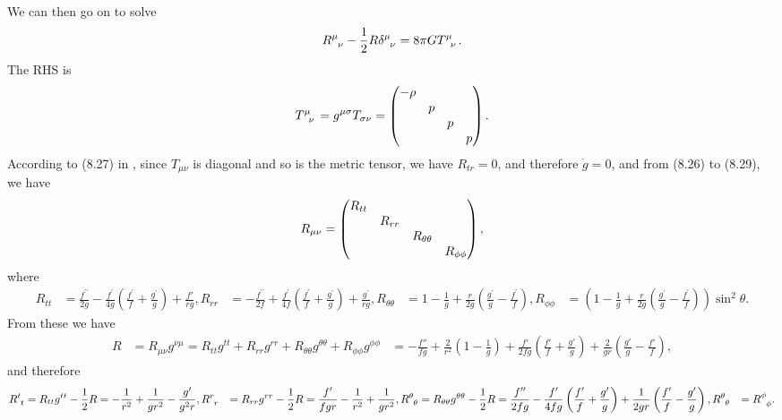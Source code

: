 \documentclass[hyperref, a4paper]{article}
\def\\{}%
\begin{document}
We can then go on to solve 
\begin{equation}
    R\indices{^\mu_\nu} - \frac{1}{2} R \delta\indices{^\mu_\nu} = 8 \pi G T\indices{^\mu_\nu}.
    \label{eq:einstein}
\end{equation}
The RHS is 
\begin{equation}
    T\indices{^\mu_\nu} = g^{\mu \sigma} T_{\sigma \nu} = \pmqty{\dmat{- \rho, p, p, p}}  .
\end{equation}
According to (8.27) in \cite{bambi2018introduction}, since $T_{\mu \nu}$ is diagonal and so is the metric tensor, 
we have $R_{tr} = 0$, and therefore $\dot{g} = 0$, and from (8.26) to (8.29), we have 
\begin{equation}
    R_{\mu \nu} = \pmqty{\dmat{R_{tt}, R_{rr}, R_{\theta \theta}, R_{\phi \phi}}},
\end{equation}
where 
\begin{equation}
    \begin{aligned}
        R_{tt} &= \frac{f^{\prime \prime}}{2 g}-\frac{f^{\prime}}{4 g}\left(\frac{f^{\prime}}{f}+\frac{g^{\prime}}{g}\right) + \frac{f'}{rg}, \\
        R_{rr} &= -\frac{f^{\prime \prime}}{2 f}+\frac{f^{\prime}}{4 f}\left(\frac{f^{\prime}}{f}+\frac{g^{\prime}}{g}\right)+\frac{g^{\prime}}{r g}, \\
        R_{\theta \theta} &= 1-\frac{1}{g}+\frac{r}{2 g}\left(\frac{g^{\prime}}{g}-\frac{f^{\prime}}{f}\right), \\
        R_{\phi \phi} &= \left(1-\frac{1}{g}+\frac{r}{2 g}\left(\frac{g^{\prime}}{g}-\frac{f^{\prime}}{f}\right)\right) \sin^2 \theta.
    \end{aligned}
\end{equation}
From these we have 
\begin{equation}
    \begin{aligned}
        R &= R_{\mu \nu} g^{\nu \mu} = R_{tt} g^{tt} + R_{rr} g^{rr} + R_{\theta \theta} g^{\theta \theta} + R_{\phi \phi} g^{\phi \phi} \\
        &= - \frac{f''}{fg} + \frac{2}{r^2} \left(1 - \frac{1}{g}\right) + \frac{f'}{2fg} \left(\frac{f'}{f} + \frac{g'}{g}\right) + \frac{2}{gr} \left( \frac{g'}{g} - \frac{f'}{f} \right),
    \end{aligned} 
\end{equation}
and therefore 
\begin{equation}
    \begin{aligned}
        R\indices{^t_t} &= R_{tt} g^{tt} - \frac{1}{2} R = - \frac{1}{r^2} + \frac{1}{g r^2} - \frac{g'}{g^2 r}, \\
        R\indices{^r_r} &= R_{rr} g^{rr} - \frac{1}{2} R = \frac{f'}{fgr} - \frac{1}{r^2} + \frac{1}{g r^2}, \\
        R\indices{^\theta_\theta} &= R_{\theta \theta} g^{\theta \theta} - \frac{1}{2} R = \frac{f''}{2 f g} - \frac{f'}{4 f g} \left(\frac{f'}{f} + \frac{g'}{g}\right) + \frac{1}{2 g r} \left( \frac{f'}{f} - \frac{g'}{g} \right), \\
        R\indices{^\theta_\theta} &= R\indices{^\phi_\phi}.
    \end{aligned}
\end{equation}
\end{document}
